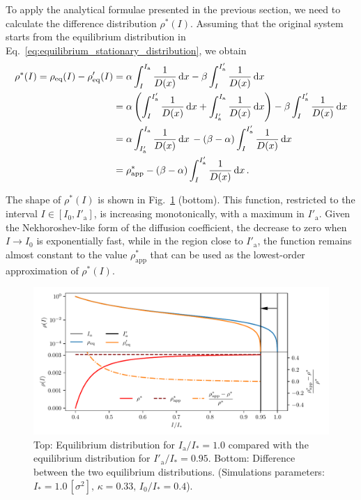 {To apply the analytical formulae presented in the previous section, we need to calculate the difference distribution $\rho^\ast(I)$. Assuming that the original system starts from the equilibrium distribution in Eq.~\eqref{eq:equilibrium_stationary_distribution}, we obtain 
\begin{align}
    \rho^\ast(I) = \rho_\text{eq}(I) - \rho'_\text{eq}(I) 
    &= \alpha \int_I^{I_\mathrm{a}} \frac{1}{D(x)}\,\mathrm{d}x - \beta \int_I^{I'_\mathrm{a}} \frac{1}{D(x)}\,\mathrm{d}x \notag \\
    &= \alpha \left( 
          \int_{I}^{I'_\mathrm{a}} \frac{1}{D(x)}\,\mathrm{d}x 
        + \int_{I'_\mathrm{a}}^{I_\mathrm{a}} \frac{1}{D(x)}\,\mathrm{d}x \right) - \beta \int_I^{I'_\mathrm{a}} \frac{1}{D(x)}\,\mathrm{d}x \notag \\
    &=  \alpha \int_{I'_\mathrm{a}}^{I_\mathrm{a}} \frac{1}{D(x)}\,\mathrm{d}x \, - (\beta - \alpha) \int_{I}^{I'_\mathrm{a}} \frac{1}{D(x)}\,\mathrm{d}x \notag \\
    &=  \rho^\ast_\text{app} - (\beta - \alpha) \int_{I}^{I'_\mathrm{a}} \frac{1}{D(x)}\,\mathrm{d}x \, .
    \label{eq:inward_difference}
\end{align}

The shape of $\rho^\ast(I)$ is shown in Fig.~\ref{fig:4} (bottom). This function, restricted to the interval $I \in [I_0, I'_\mathrm{a}]$, is increasing monotonically, with a maximum in $I'_\mathrm{a}$. Given the Nekhoroshev-like form of the diffusion coefficient, the decrease to zero when $I \to I_0$ is exponentially fast, while in the region close to $I'_\mathrm{a}$, the function remains almost constant to the value $\rho^\ast_\text{app}$ that can be used as the lowest-order approximation of $\rho^\ast(I)$.

\begin{figure}[t]
    \centering
    \includegraphics[width=\textwidth]{4_probing_the_diffusive_behavior/figs/final/difference_backwards_s.pdf}
    \caption{Top: Equilibrium distribution for $I_\mathrm{a}/I_\ast = 1.0$ compared with the  equilibrium distribution for $I'_\mathrm{a}/I_\ast = 0.95$. Bottom: Difference between the two equilibrium distributions. (Simulations parameters: $I_\ast = 1.0\,[\sigma^2],\, \kappa = 0.33,\, I_0/I_\ast = 0.4$).}
    \label{fig:4}
\end{figure}

}
